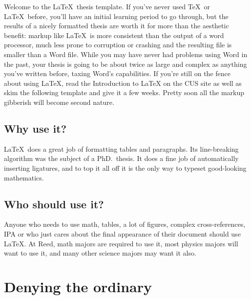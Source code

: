 \documentclass[12pt,twoside]{reedfancy}
\begin{document}
\begin{spacing}{1.25}

Welcome to the \LaTeX\ thesis template. If you've never used \TeX\ or
\LaTeX\ before, you'll have an initial learning period to go through,
but the results of a nicely formatted thesis are worth it for more
than the aesthetic benefit: markup like \LaTeX\ is more consistent
than the output of a word processor, much less prone to corruption or
crashing and the resulting file is smaller than a Word file. While you
may have never had problems using Word in the past, your thesis is
going to be about twice as large and complex as anything you've
written before, taxing Word's capabilities. If you're still on the
fence about using \LaTeX, read the Introduction to LaTeX on the CUS
site as well as skim the following template and give it a few
weeks.  Pretty soon all the markup gibberish will become second nature.


\section{Why use it?}
	
\LaTeX\ does a great job of formatting tables and paragraphs.  Its
line-breaking algorithm was the subject of a PhD.\ thesis.
It does a fine job of automatically inserting ligatures, and to top it
all off it is the only way to typeset good-looking mathematics.

\section{Who should use it?}

Anyone who needs to use math, tables, a lot of figures, complex
cross-references, IPA or who just cares about the final appearance of
their document should use \LaTeX.  At Reed, math majors are required
to use it, most physics majors will want to use it, and many other
science majors may want it also.

%

\chapter{Denying the ordinary}
\label{deny}

	

\end{spacing}
\end{document}
